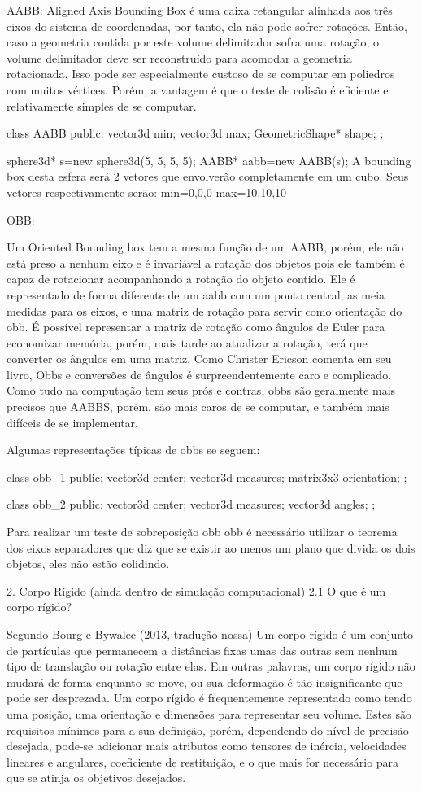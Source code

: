 AABB:
Aligned Axis Bounding Box é uma caixa retangular alinhada aos três eixos do
sistema de coordenadas, por tanto, ela não pode sofrer rotações. Então, caso a
geometria contida por este volume delimitador sofra uma rotação, o volume
delimitador deve ser reconstruído para acomodar a geometria rotacionada. Isso
pode ser especialmente custoso de se computar em poliedros com muitos vértices.
Porém, a vantagem é que o teste de colisão é eficiente e relativamente
simples de se computar.

class AABB
{
public:
vector3d min;
vector3d max;
GeometricShape* shape;
};

sphere3d* s=new sphere3d({5, 5, 5}, 5);
AABB* aabb=new AABB(s);
A bounding box desta esfera será 2 vetores que envolverão completamente em um cubo.
Seus vetores respectivamente serão:
min={0,0,0}
max={10,10,10}


OBB:

Um Oriented Bounding box tem a mesma função de um AABB, porém, ele não está
preso a nenhum eixo e é invariável a rotação dos objetos pois ele também é
capaz de rotacionar acompanhando a rotação do objeto contido. Ele é
representado de forma diferente de um aabb com um ponto central, as meia
medidas para os eixos, e uma matriz de rotação para servir como orientação do
obb. É possível representar a matriz de rotação como ângulos de Euler para
economizar memória, porém, mais tarde ao atualizar a rotação, terá que
converter os ângulos em uma matriz. Como Christer Ericson comenta em seu livro,
Obbs e conversões de ângulos é surpreendentemente caro e complicado.
Como tudo na computação tem seus prós e contras, obbs são geralmente mais
precisos que AABBS, porém, são mais caros de se computar, e também mais
difíceis de se implementar.


Algumas representações típicas de obbs se seguem:

class obb_1
{
public:
vector3d center;
vector3d measures;
matrix3x3 orientation;
};

class obb_2
{
public:
vector3d center;
vector3d measures;
vector3d angles;
};

Para realizar um teste de sobreposição obb obb é necessário utilizar o teorema
dos eixos separadores que diz que se existir ao menos um plano que divida os
dois objetos, eles não estão colidindo.



2. Corpo Rígido (ainda dentro de simulação computacional)
2.1 O que é um corpo rígido?

Segundo Bourg e Bywalec (2013, tradução nossa) Um corpo rígido é um conjunto de partículas  que permanecem a distâncias fixas umas das outras  sem nenhum tipo de translação ou rotação entre elas. Em outras palavras,  um corpo rígido não mudará de forma enquanto se move, ou sua deformação é tão insignificante que pode ser desprezada.
Um corpo rígido é  frequentemente representado como tendo uma posição, uma orientação  e  dimensões para representar seu volume. Estes são requisitos mínimos para a  sua definição, porém, dependendo do nível de precisão desejada, pode-se adicionar mais atributos como tensores de inércia, velocidades lineares e angulares, coeficiente de restituição, e o que mais for necessário para que se atinja os objetivos desejados.


